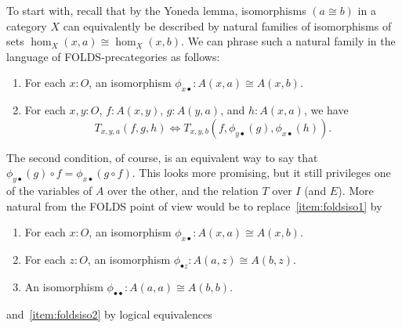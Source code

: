 \documentclass{amsart}
\begin{document}
To start with, recall that by the Yoneda lemma, isomorphisms $(a\cong b)$ in a category $X$ can equivalently be described by natural families of isomorphisms of sets $\hom_X(x,a) \cong \hom_X(x,b)$.
We can phrase such a natural family in the language of FOLDS-precategories as follows:
\begin{enumerate}
\item For each $x:O$, an isomorphism $\phi_{x\bullet}:A(x,a) \cong A(x,b)$.\label{item:foldsiso1}
\item For each $x,y:O$, $f:A(x,y)$, $g:A(y,a)$, and $h:A(x,a)$, we have\label{item:foldsiso2}
  \[T_{x,y,a}(f,g,h) \Leftrightarrow T_{x,y,b}(f,\phi_{y\bullet}(g),\phi_{x\bullet}(h)).\]
\end{enumerate}
The second condition, of course, is an equivalent way to say that $\phi_{y\bullet}(g) \circ f = \phi_{x\bullet}(g\circ f)$.
This looks more promising, but it still privileges one of the variables of $A$ over the other, and the relation $T$ over $I$ (and $E$).
More natural from the FOLDS point of view would be to replace~\ref{item:foldsiso1} by
\begin{enumerate}[label=(\alph*)]
\item For each $x:O$, an isomorphism $\phi_{x\bullet}:A(x,a) \cong A(x,b)$.\label{item:foldsiso1a}
\item For each $z:O$, an isomorphism $\phi_{\bullet z}:A(a,z) \cong A(b,z)$.\label{item:foldsiso1b}
\item An isomorphism $\phi_{\bullet\bullet}:A(a,a) \cong A(b,b)$.\label{item:foldsiso1c}
\end{enumerate}
and~\ref{item:foldsiso2} by logical equivalences
\end{document}
